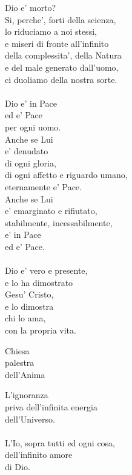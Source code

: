 \begin{haiku}
    Dio e' morto?\\
    Si, perche', forti della scienza,\\
    lo riduciamo a noi stessi,\\
    e miseri di fronte all'infinito\\
    della complessita', della Natura\\
    e del male generato dall'uomo,\\
    ci duoliamo della nostra sorte.\\
    \leavevmode\\
    Dio e' in Pace\\
    ed e' Pace\\
    per ogni uomo.\\
    Anche se Lui\\
    e' denudato\\
    di ogni gloria,\\
    di ogni affetto e riguardo umano,\\
    eternamente e' Pace.\\
    Anche se Lui\\
    e' emarginato e rifiutato,\\
    stabilmente, incessabilmente,\\
    e' in Pace\\
    ed e' Pace.\\
    \leavevmode\\
    Dio e' vero e presente,\\
    e lo ha dimostrato\\
    Gesu' Cristo,\\
    e lo dimostra\\
    chi lo ama,\\
    con la propria vita.\\
\end{haiku}

\begin{haiku}
    Chiesa\\
    palestra\\
    dell'Anima\\
\end{haiku}

\begin{haiku}
    L'ignoranza\\
    priva dell'infinita energia\\
    dell'Universo.\\
    \leavevmode\\
    L'Io, sopra tutti ed ogni cosa,\\
    dell'infinito amore\\
    di Dio.\\
\end{haiku}

